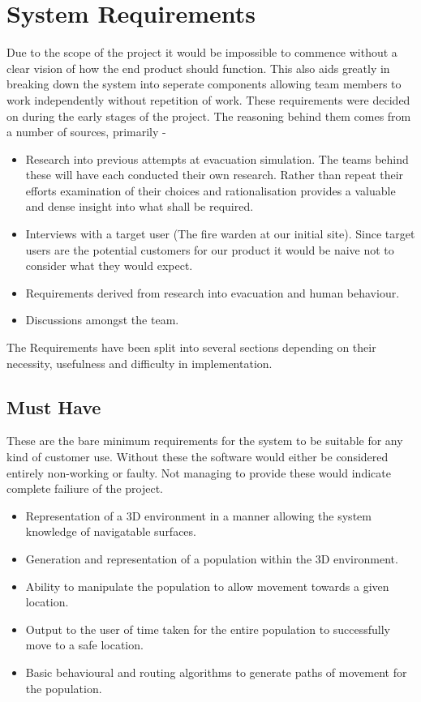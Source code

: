 

\section{System Requirements}

Due to the scope of the project it would be impossible to commence
without a clear vision of how the end product should function. This
also aids greatly in breaking down the system into seperate components
allowing team members to work independently without repetition of
work. These requirements were decided on during the early stages of
the project. The reasoning behind them comes from a number of sources,
primarily -
\begin{itemize}
\item Research into previous attempts at evacuation simulation. The teams
behind these will have each conducted their own research. Rather than
repeat their efforts examination of their choices and rationalisation
provides a valuable and dense insight into what shall be required.
\item Interviews with a target user (The fire warden at our initial site).
Since target users are the potential customers for our product it
would be naive not to consider what they would expect.
\item Requirements derived from research into evacuation and human behaviour.
\item Discussions amongst the team.
\end{itemize}
The Requirements have been split into several sections depending on
their necessity, usefulness and difficulty in implementation.


\subsection{Must Have}

These are the bare minimum requirements for the system to be suitable
for any kind of customer use. Without these the software would either
be considered entirely non-working or faulty. Not managing to provide
these would indicate complete failiure of the project.
\begin{itemize}
\item Representation of a 3D environment in a manner allowing the system
knowledge of navigatable surfaces.
\item Generation and representation of a population within the 3D environment.
\item Ability to manipulate the population to allow movement towards a given
location.
\item Output to the user of time taken for the entire population to successfully
move to a safe location.
\item Basic behavioural and routing algorithms to generate paths of movement
for the population.
\end{itemize}

